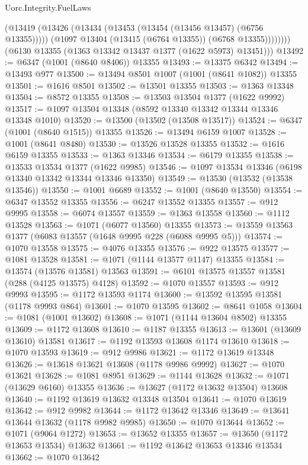\begin{lexlean}{Uorc.Integrity.FuelLaws}
\begin{coremodule}
                (@13419
                  (@13426 (@13434 (@13453 (@13454 (@13456 @13457) (@6756 @13355)))))
                  (@1097 @13404 (@13415 (@6764 @13355)) (@6768 @13355))))))))
      (@6130 @13355 (@1363 @13342 @13437 @1377 (@1622 @5973) @13451)))
@13492 := @6347 (@1001 (@8640 @8406)) @13355
@13493 := @13375 @6342
@13494 := @13493 @977
@13500 := @13494 @8501 @1007 (@1001 (@8641 @1082)) @13355
@13501 := @1616 @8501
@13502 := @13501 @13355
@13503 := @1363 @13348
@13504 := @8572 @13355
@13508 := @13503 @13504 @1377 (@1622 @9992)
@13517 := @1097 @13504 @13348 (@8592 @13340 @13342 @13344 @13346 @13348 @1010)
@13520 := @13500 (@13502 (@13508 @13517))
@13524 := @6347 (@1001 (@8640 @1515)) @13355
@13526 := @13494 @6159 @1007
@13528 := @1001 (@8641 @8480)
@13530 := @13526 @13528 @13355
@13532 := @1616 @6159 @13355
@13533 := @1363 @13346
@13534 := @6179 @13355
@13538 := @13533 @13534 @1377 (@1622 @9985)
@13546 := @1097 @13534 @13346 (@6198 @13340 @13342 @13344 @13346 @13350)
@13549 := @13530 (@13532 (@13538 @13546))
@13550 := @1001 @6689
@13552 := @1001 (@8640 @13550)
@13554 := @6347 @13552 @13355
@13556 := @6247 @13552 @13355
@13557 := @912 @9995
@13558 := @6074 @13557
@13559 := @1363 @13558
@13560 := @1112 @13528
@13563 := @1071 (@6077 @13560) @13355
@13573 := @13559 @13563 @1377 (@6083 @13557 (@1648 @9995 @228 (@6088 @9995 @5)))
@13574 := @1070 @13558
@13575 := @4076 @13355
@13576 := @922 @13575
@13577 := @1081 @13528
@13581 := @1071 (@1144 @13577 @1147) @13355
@13584 := @13574 (@13576 @13581) @13563
@13591 := @6101 @13575 @13557 @13581 (@288 (@4125 @13575) @4128)
@13592 := @1070 @13557
@13593 := @912 @9993
@13595 := @1172 @13593 @1174
@13600 := @13592 @13595 @13581 (@1178 @9993 @864)
@13601 := @1070 @13595
@13602 := @8641 @1058
@13604 := @1081 (@1001 @13602)
@13608 := @1071 (@1144 @13604 @8502) @13355
@13609 := @1172 @13608
@13610 := @1187 @13355
@13613 := @13601 (@13609 @13610) @13581
@13617 := @1192 @13593 @13608 @1174 @13610
@13618 := @1070 @13593
@13619 := @912 @9986
@13621 := @1172 @13619 @13348
@13626 := @13618 @13621 @13608 (@1178 @9986 @9992)
@13627 := @1070 @13621
@13628 := @1081 @8951
@13629 := @1144 @13628
@13632 := @1071 (@13629 @6160) @13355
@13636 := @13627 (@1172 @13632 @13504) @13608
@13640 := @1192 @13619 @13632 @13348 @13504
@13641 := @1070 @13619
@13642 := @912 @9982
@13644 := @1172 @13642 @13346
@13649 := @13641 @13644 @13632 (@1178 @9982 @9985)
@13650 := @1070 @13644
@13652 := @1071 (@9064 @1272)
@13653 := @13652 @13355
@13657 := @13650 (@1172 @13653 @13534) @13632
@13661 := @1192 @13642 @13653 @13346 @13534
@13662 := @1070 @13642

\end{coremodule}
\end{lexlean}

